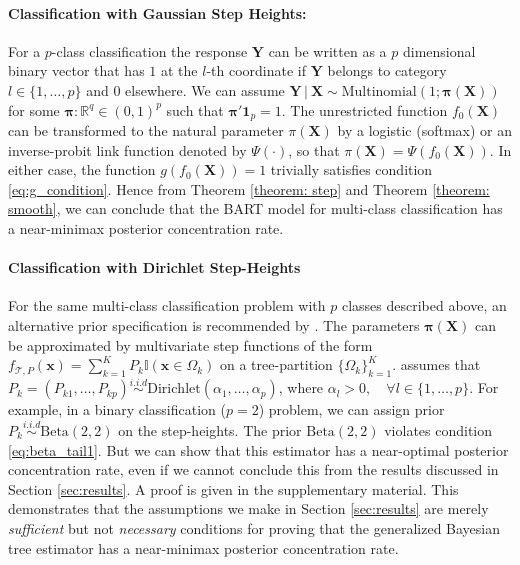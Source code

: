 \documentclass[12pt]{article}
\newcommand{\bm}[1]{\boldsymbol{#1}}
\newcommand{\Y}{\bm{Y}}
\newcommand{\mT}{\mathcal{T}}
\newcommand{\1}{\mathbb{I}}
\def\C {\,|\:}
\def\C {\,|\:}
\def\Y{\bm{Y}}
\def\X{\bm{X}}
\def\x{\bm{x}}
\def\C{\mbox{\boldmath$C$}}
\def\x{\mbox{\boldmath$x$}}
\def\X{\mbox{\boldmath$X$}}
\renewcommand{\Y}{\bm{Y}}
\def\C {\,|\:}
\def\C {\,|\:}
\def\X{\bm{X}}
\def\x{\bm{x}}
\theoremstyle{plain}
\theoremstyle{definition}
\theoremstyle{remark}
\begin{document}
\paragraph{Classification with Gaussian Step Heights:}
For a $p$-class classification the response $\Y$ can be written as a $p$ dimensional binary vector that has $1$ at the $l$-th coordinate if $\Y$ belongs to category $l \in \{1,\dots,p\}$ and $0$ elsewhere. We can assume $\Y \C \X \sim \text{Multinomial}(1; \bm{\pi}(\X))$
for some $\bm{\pi}: \mathbb{R}^q \in (0,1)^p$ such that $\bm{\pi}'\textbf{1}_p = 1$. The unrestricted function $f_0(\X)$ can be transformed to the natural parameter $\pi(\X)$ by a logistic (softmax) or an inverse-probit link function \citep{chipman2010bart} denoted by $\Psi(\cdot)$, so that $\pi(\X) = \Psi(f_0(\X))$. In either case, the function $g(f_0(\X)) = 1$ trivially satisfies condition \eqref{eq:g_condition}. Hence from Theorem \ref{theorem: step} and Theorem \ref{theorem: smooth}, we can conclude that the BART model for multi-class classification has a near-minimax posterior concentration rate.

\paragraph{Classification with Dirichlet Step-Heights}
For the same multi-class classification problem with $p$ classes described above, an alternative prior specification is recommended by \cite{denison1998bayesian}. The parameters $\bm{\pi}(\X)$ can be approximated by multivariate step functions of the form $f_{\mT,{P}}(\x)=\sum_{k=1}^K P_k\mathbb{I}(\x\in\Omega_k)$
on a tree-partition $\{\Omega_k\}_{k=1}^K$. \cite{denison1998bayesian} assumes that $P_k = \left (P_{k1},\dots,P_{kp} \right ) \stackrel{i.i.d}{\sim} \text{Dirichlet}(\alpha_1,\dots,\alpha_p)$, where $\alpha_l > 0, \quad \forall l \in \{1,\dots,p\}$. For example, in a binary classification ($p=2$) problem, we can assign prior $P_k \stackrel{i.i.d}{\sim} \text{Beta}(2,2)$ on the step-heights. The prior $\text{Beta}(2,2)$ violates condition \eqref{eq:beta_tail1}. But we can show that this estimator has a near-optimal posterior concentration rate, even if we cannot conclude this from the results discussed in Section \ref{sec:results}. A proof is given in the supplementary material. This demonstrates that the assumptions we make in Section \ref{sec:results} are merely {\it sufficient} but not {\it necessary} conditions for proving that the generalized Bayesian tree estimator has a near-minimax posterior concentration rate.
\end{document}
